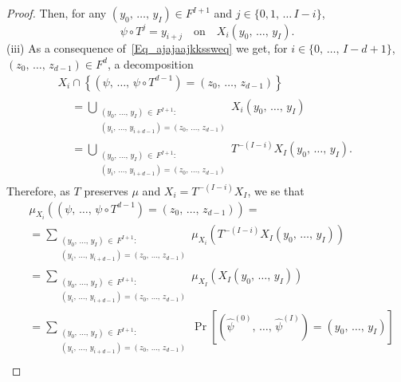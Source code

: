 \documentclass[10pt]{amsart}
\theoremstyle{definition}\newtheorem{defi}[theo]{Definition}\newtheorem{rema}[theo]{Remark}\newtheorem{exam}[theo]{Example}\newtheorem{exem}[theo]{Example}\newtheorem{nota}[theo]{Notation}
\begin{document}
\begin{proof}
Then, for any $(y_{0},\,\ldots,\,y_{I})\in F^{I+1}$ and $j\in\{0,1,\,\ldots\,I-i\}$,
\begin{equation}\label{Eq_ajajaajkkssweq}
\psi\circ T^{j}=y_{i+j}\quad \text{on}\quad X_{i}\left(y_{0},\,\ldots,\,y_{I}\right).
\end{equation}
(iii) As a consequence of~\eqref{Eq_ajajaajkkssweq} we get, for $i\in\{0,\,\ldots,\,I-d+1\}$, $(z_{0},\,\ldots,\,z_{d-1})\in F^{d}$, a decomposition
\begin{multline*}
X_{i}\cap\left\{\left(\psi,\,\ldots,\,\psi\circ T^{d-1}\right)=\left(z_{0},\,\ldots,\,z_{d-1}\right)\right\}\\
\begin{aligned}
&= {\displaystyle\bigcup\nolimits_{\substack{\left(y_{0},\,\ldots,\,y_{I}\right)\,\in\,F^{I+1}:\\
\left(y_{i},\,\ldots,\,y_{i+d-1}\right)=\left(z_{0},\,\ldots,\,z_{d-1}\right)}}} X_{i}\left(y_{0},\,\ldots,\,y_{I}\right)\\
&= {\displaystyle\bigcup\nolimits_{\substack{\left(y_{0},\,\ldots,\,y_{I}\right)\,\in\,F^{I+1}:\\
\left(y_{i},\,\ldots,\,y_{i+d-1}\right)=\left(z_{0},\,\ldots,\,z_{d-1}\right)}}} T^{-(I-i)}X_{I}\left(y_{0},\,\ldots,\,y_{I}\right).
\end{aligned}
\end{multline*}
Therefore, as $T$ preserves $\mu$ and $X_{i}=T^{-(I-i)}X_{I}$, we se that
\begin{align*}
& \mu_{X_{i}}\left(\left(\psi,\,\ldots,\,\psi\circ T^{d-1}\right)=\left(z_{0},\,\ldots,\,z_{d-1}\right)\right)=\\
& = {\displaystyle\sum\nolimits_{\substack{\left(y_{0},\,\ldots,\,y_{I}\right)\,\in\,F^{I+1} :\\
\left(y_{i},\,\ldots,\,y_{i+d-1}\right)=\left(z_{0},\,\ldots,\,z_{d-1}\right)}}}
\mu_{X_{i}}\left(T^{-(I-i)}X_{I}\left(y_{0},\,\ldots,\,y_{I}\right)\right)\\
& = {\displaystyle\sum\nolimits_{\substack{\left(y_{0},\,\ldots,\,y_{I}\right)\,\in\,F^{I+1} :\\
\left(y_{i},\,\ldots,\,y_{i+d-1}\right)=\left(z_{0},\,\ldots,\,z_{d-1}\right)}}}
\mu_{X_{I}}\left(X_{I}\left(y_{0},\,\ldots,\,y_{I}\right)\right)\\
& = {\displaystyle\sum\nolimits_{\substack{\left(y_{0},\,\ldots,\,y_{I}\right)\,\in\,F^{I+1} :\\
\left(y_{i},\,\ldots,\,y_{i+d-1}\right)=\left(z_{0},\,\ldots,\,z_{d-1}\right)}}}
\Pr\left[\left(\widehat{\psi}^{(0)},\,\ldots,\,\widehat{\psi}^{(I)}\right)=\left(y_{0},\,\ldots,\,y_{I}\right)\right]\\

\end{align*}
\end{proof}
\end{document}

